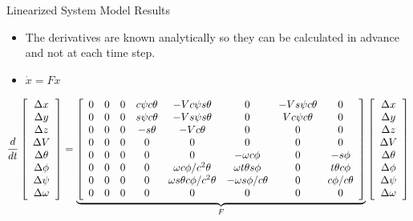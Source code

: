 \documentclass[hyperref={pdfpagelabels=false}]{beamer}
\begin{document}
\begin{frame}{Linearized System Model Results}
\begin{itemize}
\item The derivatives are known analytically so they can be calculated in advance and not at each time step.
\item $\dot{x} = Fx$
\end{itemize}
{\tiny
\begin{align*}
\frac{d}{dt}\left[\begin{array}{c}
\Delta x \\ \Delta y \\ \Delta z \\ \Delta V \\ \Delta \theta \\ \Delta \phi \\ \Delta \psi \\ \Delta \omega
\end{array}\right] =
\underbrace{\left[\begin{array}{c c c c c c c c}
0 & 0 & 0 & c\psi c\theta & -V c\psi s\theta               & 0                     & -V s\psi c\theta & 0 \\
0 & 0 & 0 & s\psi c\theta & -V s\psi s\theta               & 0                     & V c\psi c\theta  & 0 \\
0 & 0 & 0 & -s\theta      & -V c\theta                     & 0                     & 0                & 0 \\
0 & 0 & 0 & 0             & 0                              & 0                     & 0                & 0 \\
0 & 0 & 0 & 0             & 0                              & -\omega c\phi         & 0                & -s\phi \\
0 & 0 & 0 & 0             & \omega c\phi/c^2\theta         & \omega t\theta s\phi  & 0                & t\theta c\phi \\
0 & 0 & 0 & 0             & \omega s\theta c\phi/c^2\theta & -\omega s\phi/c\theta & 0                & c\phi/c\theta \\
0 & 0 & 0 & 0             & 0                              & 0                     & 0                & 0
\end{array}\right]}_{F}
\left[\begin{array}{c}
\Delta x \\ \Delta y \\ \Delta z \\ \Delta V \\ \Delta \theta \\ \Delta \phi \\ \Delta \psi \\ \Delta \omega
\end{array}\right]
\end{align*}
}
\end{frame}
\end{document}
